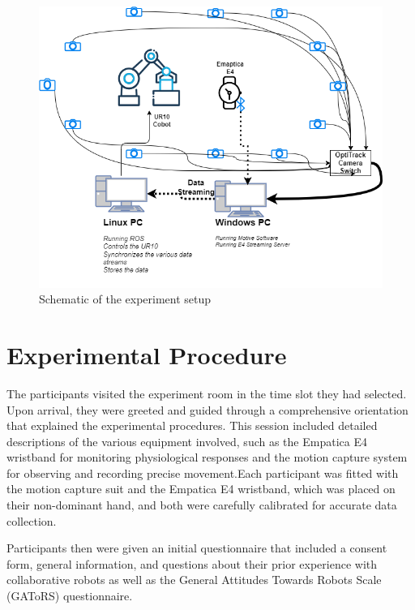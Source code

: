 \begin{figure}[h]
	\centering
	\includegraphics[width=0.8\columnwidth]{images/network2.png}
	\caption{Schematic of the experiment setup}
	\label{fig:netwrok}
\end{figure}


\section{Experimental Procedure}
The participants visited the experiment room in the time slot they had selected. 
Upon arrival, they were greeted and guided through a comprehensive orientation that explained the experimental procedures. This session included detailed descriptions of the various equipment involved, such as the Empatica E4 wristband for monitoring physiological responses and the motion capture system for observing and recording precise movement.Each participant was fitted with the motion capture suit and the Empatica E4 wristband, which was placed on their non-dominant hand, and both were carefully calibrated for accurate data collection.

Participants then were given an initial questionnaire that included a consent form, general information, and questions about their prior experience with collaborative robots as well as the General Attitudes Towards Robots Scale (GAToRS) questionnaire.

